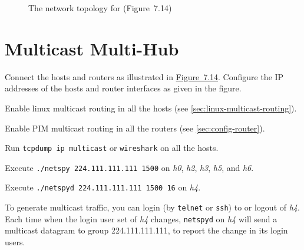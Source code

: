 \documentclass{../UTNetLab}
\begin{document}
\begin{figure}[H]
        \caption{The network topology for  (Figure~7.14)}
        \label{fig:7.14}
    \end{figure}

\section{Multicast Multi-Hub}
    Connect the hosts and routers as illustrated in \hyperref[fig:7.14]{Figure~7.14}.
    Configure the IP addresses of the hosts and router interfaces as given in the figure.


    Enable linux multicast routing in all the hosts (see \autoref{sec:linux-multicast-routing}).

    Enable PIM multicast routing in all the routers (see \autoref{sec:config-router}).

    Run \lstinline{tcpdump ip multicast} or \lstinline{wireshark} on all the hosts.

    Execute \lstinline{./netspy 224.111.111.111 1500} on \textit{h0}, \textit{h2}, \textit{h3}, \textit{h5}, and \textit{h6}.

    Execute \lstinline{./netspyd 224.111.111.111 1500 16} on \textit{h4}.
    
    To generate multicast traffic, you can login (by \lstinline{telnet} or \lstinline{ssh}) to or logout of \textit{h4}.
    Each time when the login user set of \textit{h4} changes, \lstinline{netspyd} on \textit{h4} will send a multicast datagram to group 224.111.111.111, to report the change in its login users.
\end{document}
